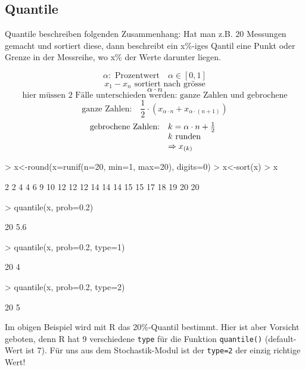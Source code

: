 \subsection{Quantile}
Quantile beschreiben folgenden Zusammenhang: Hat man z.B. 20 Messungen gemacht
und sortiert diese, dann beschreibt ein x\%-iges Qantil eine Punkt oder Grenze
in der Messreihe, wo x\% der Werte darunter liegen.

\[ \alpha: \text{ Prozentwert} \quad \alpha \in [0,1] \]
\[ x_1 - x_n \text{ sortiert nach grösse}  \]
\[ \alpha \cdot n \]
\[ \text{hier müssen 2 Fälle unterschieden werden: ganze Zahlen und gebrochene} \]
\[ \text{ganze Zahlen:} \quad \frac{1}{2} 
\cdot (x_{\alpha \cdot n} + x_{\alpha \cdot (n+1)}) \]
\[ \begin{array}{@{}@{}ll}
	\text{gebrochene Zahlen:} & k=\alpha \cdot n + \frac{1}{2} \\
	                          & k \text{ runden} \\
				  & \Rightarrow x_{(k)}
\end{array}\]

\begin{Schunk}
\begin{Sinput}
> x<-round(x=runif(n=20, min=1, max=20), digits=0)
> x<-sort(x)
> x
\end{Sinput}
\begin{Soutput}
 [1]  2  2  4  4  6  9 10 12 12 12 14 14 14 15 15 17 18 19 20 20
\end{Soutput}
\begin{Sinput}
> quantile(x, prob=0.2)
\end{Sinput}
\begin{Soutput}
20%
5.6 
\end{Soutput}
\begin{Sinput}
> quantile(x, prob=0.2, type=1)
\end{Sinput}
\begin{Soutput}
20%
  4 
\end{Soutput}
\begin{Sinput}
> quantile(x, prob=0.2, type=2)
\end{Sinput}
\begin{Soutput}
20%
  5 
\end{Soutput}
\end{Schunk}
Im obigen Beispiel wird mit R das 20\%-Quantil bestimmt. Hier ist aber 
Vorsicht geboten, denn R hat 9 verschiedene \verb!type! für die Funktion
\verb!quantile()! (default-Wert ist 7). Für uns aus dem 
Stochastik-Modul ist der \verb!type=2! 
der einzig richtige Wert!

